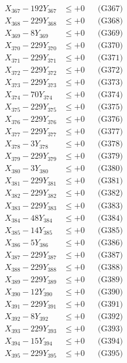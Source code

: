 \documentclass[a4paper,10pt]{article}
\begin{document}
{\begin{align}
X_{367} - 192Y_{367} &\leq +0 && \text{(G367)} \\
X_{368} - 229Y_{368} &\leq +0 && \text{(G368)} \\
X_{369} - 8Y_{369} &\leq +0 && \text{(G369)} \\
X_{370} - 229Y_{370} &\leq +0 && \text{(G370)} \\
\allowbreak
X_{371} - 229Y_{371} &\leq +0 && \text{(G371)} \\
X_{372} - 229Y_{372} &\leq +0 && \text{(G372)} \\
X_{373} - 229Y_{373} &\leq +0 && \text{(G373)} \\
X_{374} - 70Y_{374} &\leq +0 && \text{(G374)} \\
X_{375} - 229Y_{375} &\leq +0 && \text{(G375)} \\
X_{376} - 229Y_{376} &\leq +0 && \text{(G376)} \\
X_{377} - 229Y_{377} &\leq +0 && \text{(G377)} \\
X_{378} - 3Y_{378} &\leq +0 && \text{(G378)} \\
X_{379} - 229Y_{379} &\leq +0 && \text{(G379)} \\
X_{380} - 3Y_{380} &\leq +0 && \text{(G380)} \\
\allowbreak
X_{381} - 229Y_{381} &\leq +0 && \text{(G381)} \\
X_{382} - 229Y_{382} &\leq +0 && \text{(G382)} \\
X_{383} - 229Y_{383} &\leq +0 && \text{(G383)} \\
X_{384} - 48Y_{384} &\leq +0 && \text{(G384)} \\
X_{385} - 14Y_{385} &\leq +0 && \text{(G385)} \\
X_{386} - 5Y_{386} &\leq +0 && \text{(G386)} \\
X_{387} - 229Y_{387} &\leq +0 && \text{(G387)} \\
X_{388} - 229Y_{388} &\leq +0 && \text{(G388)} \\
X_{389} - 229Y_{389} &\leq +0 && \text{(G389)} \\
X_{390} - 12Y_{390} &\leq +0 && \text{(G390)} \\
\allowbreak
X_{391} - 229Y_{391} &\leq +0 && \text{(G391)} \\
X_{392} - 8Y_{392} &\leq +0 && \text{(G392)} \\
X_{393} - 229Y_{393} &\leq +0 && \text{(G393)} \\
X_{394} - 15Y_{394} &\leq +0 && \text{(G394)} \\
X_{395} - 229Y_{395} &\leq +0 && \text{(G395)} \\

\end{align}}
\end{document}
